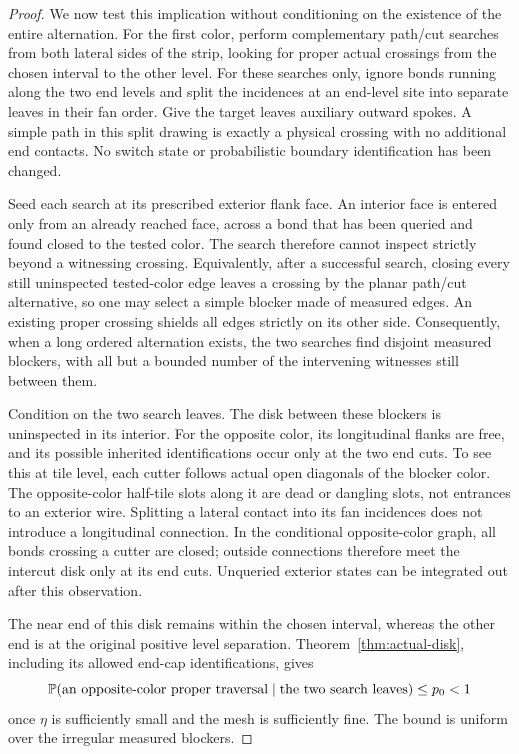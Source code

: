 \begin{proof}
We now test this implication without conditioning on the existence
of the entire alternation.  For the first color, perform complementary
path/cut searches from both lateral sides of the strip, looking for
proper actual crossings from the chosen interval to the other level.
For these searches only, ignore bonds running along the two end
levels and split the incidences at an end-level site into separate
leaves in their fan order.  Give the target leaves auxiliary outward
spokes.  A simple path in this split drawing is exactly a physical
crossing with no additional end contacts.  No switch state or
probabilistic boundary identification has been changed.

Seed each search at its prescribed exterior flank face.  An interior
face is entered only from an already reached face, across a bond that
has been queried and found closed to the tested color.  The search
therefore cannot inspect strictly beyond a witnessing crossing.
Equivalently, after
a successful search, closing every still uninspected tested-color
edge leaves a crossing by the planar path/cut alternative, so one
may select a simple blocker made of measured edges.  An existing
proper crossing shields all edges strictly on its other side.
Consequently, when a long ordered alternation exists, the two
searches find disjoint measured blockers, with all but a bounded
number of the intervening witnesses still between them.

Condition on the two search leaves.  The disk between these
blockers is uninspected in its interior.  For the opposite color,
its longitudinal flanks are free, and its possible inherited
identifications occur only at the two end cuts.  To see this at
tile level, each cutter follows actual open diagonals of the
blocker color.  The opposite-color half-tile slots along it are
dead or dangling slots, not entrances to an exterior wire.
Splitting a lateral contact into its fan incidences does not
introduce a longitudinal connection.  In the conditional
opposite-color graph, all bonds crossing a cutter are closed;
outside connections therefore meet the intercut disk only at
its end cuts.  Unqueried exterior states can be integrated out
after this observation.

The near end of this disk remains within the chosen interval,
whereas the other end is at the original positive level
separation.  Theorem~\ref{thm:actual-disk}, including its allowed
end-cap identifications, gives
\begin{equation}\label{angular:one-round}
 \mathbb P(\text{an opposite-color proper traversal}
       \mid\text{the two search leaves})\le p_0<1
\end{equation}
once \(\eta\) is sufficiently small and the mesh is sufficiently
fine.  The bound is uniform over the irregular measured blockers.


\end{proof}

